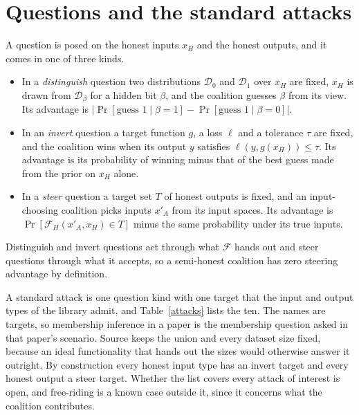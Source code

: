 \documentclass{labreport}
\newcommand{\IF}{\mathcal{F}}
\begin{document}
\section{Questions and the standard attacks}

A question is posed on the honest inputs $x_H$ and the honest outputs, and it comes in one of three kinds.
\begin{itemize}
  \item In a \emph{distinguish} question two distributions $\mathcal{D}_0$ and $\mathcal{D}_1$ over $x_H$ are fixed, $x_H$ is drawn from $\mathcal{D}_\beta$ for a hidden bit $\beta$, and the coalition guesses $\beta$ from its view. Its advantage is $\lvert\Pr[\text{guess } 1\mid\beta=1]-\Pr[\text{guess } 1\mid\beta=0]\rvert$.
  \item In an \emph{invert} question a target function $g$, a loss $\ell$ and a tolerance $\tau$ are fixed, and the coalition wins when its output $y$ satisfies $\ell(y,g(x_H))\le\tau$. Its advantage is its probability of winning minus that of the best guess made from the prior on $x_H$ alone.
  \item In a \emph{steer} question a target set $T$ of honest outputs is fixed, and an input-choosing coalition picks inputs $x'_A$ from its input spaces. Its advantage is $\Pr[\IF_H(x'_A,x_H)\in T]$ minus the same probability under its true inputs.
\end{itemize}
Distinguish and invert questions act through what $\IF$ hands out and steer questions through what it accepts, so a semi-honest coalition has zero steering advantage by definition.

A standard attack is one question kind with one target that the input and output types of the library admit, and Table~\ref{attacks} lists the ten.
The names are targets, so membership inference in a paper is the membership question asked in that paper's scenario.
Source keeps the union and every dataset size fixed, because an ideal functionality that hands out the sizes would otherwise answer it outright.
By construction every honest input type has an invert target and every honest output a steer target.
Whether the list covers every attack of interest is open, and free-riding is a known case outside it, since it concerns what the coalition contributes.



\end{document}
